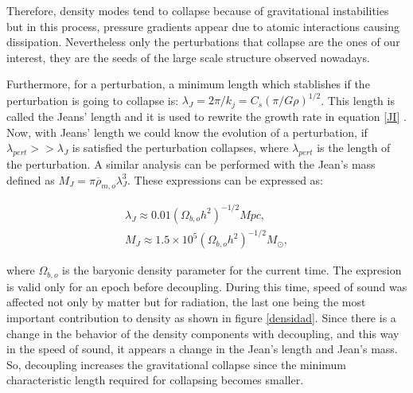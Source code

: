 Therefore, density modes tend to collapse because of gravitational instabilities but 
in this process, pressure gradients appear due to atomic interactions causing dissipation. 
Nevertheless only the perturbations that collapse are the ones of our interest, they are the 
seeds of the large scale structure observed nowadays.

Furthermore, for a perturbation, a minimum length which stablishes  
if the perturbation is going to collapse is: $\lambda_J = 2\pi/k_j = C_s(\pi/G\rho)^{1/2}$. 
This length is called the Jeans' length and it is used to rewrite the growth rate in equation \ref{JI} . 
Now, with Jeans' length we could know the evolution of a perturbation,
if $\lambda_{pert}>>\lambda_J$ is satisfied the perturbation collapses, 
where $\lambda_{pert}$ is the length of the perturbation. A similar analysis
can be performed with the Jean's mass defined as $M_J =  \pi\overline{\rho}_{m,o}\lambda_J^3 $.
These expressions can be expressed as:

\begin{eqnarray*}
\lambda_J \approx 0.01(\Omega_{b,o}h^2)^{-1/2}Mpc ,\\
M_J \approx 1.5\times 10^5 (\Omega_{b,o}h^2)^{-1/2}M_{\odot} ,
\end{eqnarray*}


where $\Omega_{b,o}$ is the baryonic density parameter for the current time. 
The expresion is valid only for an epoch before decoupling. 
During this time, speed of sound was affected not only by matter but for radiation, 
the last one being the most important contribution to density as 
shown in figure \ref{densidad}. 
Since there is a change in the 
behavior of the density components with decoupling, and this way in the
speed of sound, it appears a change in the Jean's length and Jean's mass.
So, decoupling increases the gravitational collapse since the minimum characteristic length
required for collapsing becomes smaller.


